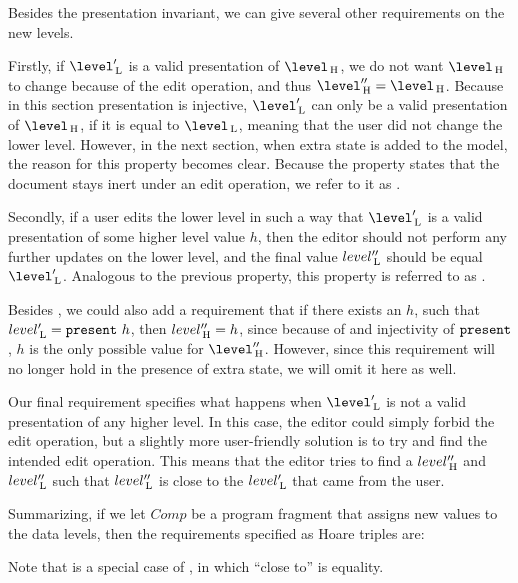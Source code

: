Besides the presentation invariant, we can give several other requirements on the new levels.

Firstly, if $\level'\L$ is a valid presentation of $\level\H$, we do not want $\level\H$ to change because of the edit operation, and thus $\level''\H = \level\H$. Because in this section presentation is injective, $\level'\L$ can only be a valid presentation of $\level\H$, if it is equal to $\level\L$, meaning that the user did not change the lower level. However, in the next section, when extra state is added to the model, the reason for this property becomes clear. Because the property states that the document stays inert under an edit operation, we refer to it as .

Secondly, if a user edits the lower level in such a way that $\level'\L$ is a valid presentation of some higher level value $h$, then the editor should not perform any further updates on the lower level, and the final value $level''_{\, \mathrm L}$ should be equal $\level'\L$. Analogous to the previous property, this property is referred to as .

Besides , we could also add a requirement that if there exists an $h$, such that $level'_{\, \mathrm L} = {\tt present}~h$, then $level''_{\, \mathrm H} = h$, since because of  and injectivity of ${\tt present}$, $h$ is the only possible value for $\level''\H$. However, since this requirement will no longer hold in the presence of extra state, we will omit it here as well.

Our final requirement specifies what happens when $\level'\L$ is not a valid presentation of any higher level. In this case, the editor could simply forbid the edit operation, but a slightly more user-friendly solution is to try and find the intended edit operation. This means that the editor tries to find a $level''_{\, \mathrm H}$ and $level''_{\, \mathrm L}$ such that $level''_{\, \mathrm L}$ is close to the $level'_{\, \mathrm L}$ that came from the user. 

Summarizing, if we let $Comp$ be a program fragment that assigns new values to the data levels, then the requirements specified as Hoare triples are:


Note that  is a special case of , in which ``close to'' is equality.

